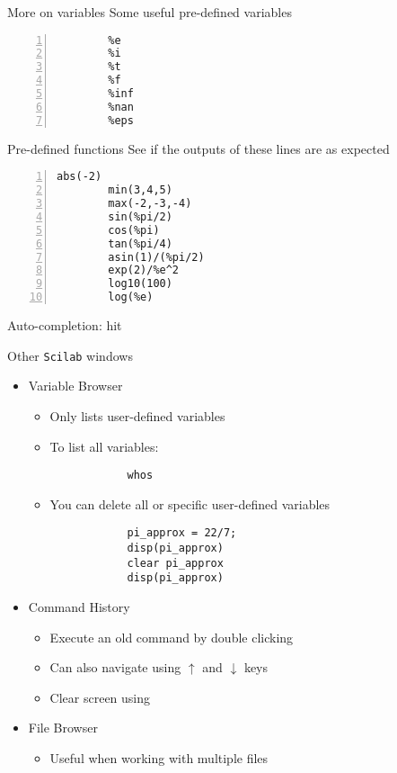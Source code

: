 \documentclass[%
    10pt,
    xcolor={dvipsnames},
    compress, %
]{beamer}
\newcommand{\keyword}[1]{#1}
\newcommand{\scilab}{\texttt{Scilab}}
\begin{document}
\begin{frame}[fragile]{More on variables}
    Some useful pre-defined variables
    \begin{lstlisting}[numbers=left]
        %pi
        %e
        %i
        %t
        %f
        %inf
        %nan
        %eps
    \end{lstlisting}
\end{frame}

\begin{frame}[fragile]{Pre-defined functions}
    See if the outputs of these lines are as expected
    \begin{lstlisting}[numbers=left]
        abs(-2)
        min(3,4,5)
        max(-2,-3,-4)
        sin(%pi/2)
        cos(%pi)
        tan(%pi/4)
        asin(1)/(%pi/2)
        exp(2)/%e^2
        log10(100)
        log(%e)
    \end{lstlisting}
    Auto-completion: hit 
\end{frame}

\begin{frame}[fragile]{Other \scilab{} windows}
\begin{itemize}
    \item \keyword{Variable Browser}
    \begin{itemize}
        \item Only lists user-defined variables
        \item To list all variables:
        \begin{lstlisting}
            whos
        \end{lstlisting}
        \item You can delete all or specific user-defined variables
        \begin{lstlisting}
            pi_approx = 22/7;
            disp(pi_approx)
            clear pi_approx
            disp(pi_approx)
        \end{lstlisting}
    \end{itemize}
    \item \keyword{Command History}
    \begin{itemize}
        \item Execute an old command by double clicking
        \item Can also navigate using $\uparrow$ and $\downarrow$ keys
        \item Clear screen using 
    \end{itemize}
    \item \keyword{File Browser}
    \begin{itemize}
        \item Useful when working with multiple files
    \end{itemize}
\end{itemize}
\end{frame}
\end{document}
